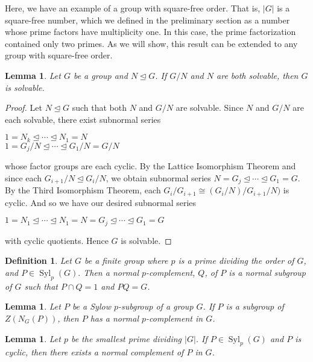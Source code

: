 \documentclass[12pt]{report}
\theoremstyle{newthm}
\newtheorem{Definition}[lem]{Definition}
\newtheorem{Lemma}[lem]{Lemma}
\DeclareMathOperator{\Syl}{Syl}
\begin{document}
Here, we have an example of a group with square-free order. That is, $|G|$ is a square-free number, which we defined in the preliminary section as a number whose prime factors have multiplicity one. In this case, the prime factorization contained only two primes. As we will show, this result can be extended to any group with square-free order.

\begin{Lemma}\label{G/N and N} Let $G$ be a group and $N\trianglelefteq G$. If $G/N$ and $N$ are both solvable, then $G$ is solvable.
\end{Lemma}

\begin{proof}
Let $N\trianglelefteq G$ such that both $N$ and $G/N$ are solvable. Since $N$ and $G/N$ are each solvable, there exist subnormal series 
\begin{center}
    $1 = N_k \trianglelefteq \dotsi\trianglelefteq N_1=N$ \\
    $1=G_j/N\trianglelefteq\dotsi\trianglelefteq G_1/N=G/N$
\end{center}
whose factor groups are each cyclic. By the Lattice Isomorphism Theorem and since each $G_{i+1}/N\trianglelefteq G_i/N$, we obtain subnormal series $N = G_j\trianglelefteq\dotsi\trianglelefteq G_1=G$. By the Third Isomorphism Theorem, each $G_i/G_{i+1}\cong (G_i/N)/G_{i+1}/N)$ is cyclic. And so we have our desired subnormal series 
\begin{center}
    $1=N_1\trianglelefteq\dotsi\trianglelefteq N_1=N=G_j\trianglelefteq \dotsi \trianglelefteq G_1= G$
\end{center}
with cyclic quotients. Hence $G$ is solvable.
\end{proof}

\begin{Definition}
Let $G$ be a finite group where $p$ is a prime dividing the order of $G$, and $P\in \Syl_p(G).$ Then a normal \textit{$p$-complement}, $Q$, of $P$ is a normal subgroup of $G$ such that $P\cap Q = {1}$ and $PQ=G$.
\end{Definition}

\begin{Lemma}\label{Z(N_G(P))}\cite[pg 327]{Burnside} Let $P$ be a Sylow $p$-subgroup of a group $G$. If $P$ is a subgroup of $Z(N_G(P))$, then $P$ has a normal $p$-complement in $G$.

\end{Lemma}

\begin{Lemma}\label{exist p-comp} Let $p$ be the smallest prime dividing $|G|$. If $P\in \Syl_p(G)$ and $P$ is cyclic, then there exists a normal complement of $P$ in $G$.

\end{Lemma}
\end{document}

